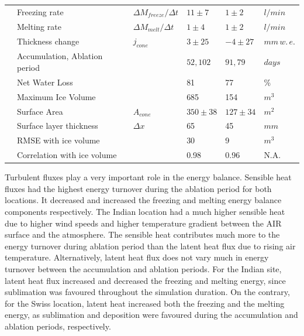 \documentclass[utf8]{frontiersSCNS}
\begin{document}
\begin{table}
\begin{tabular}{@{}|llllll|@{}}
		                       & Freezing rate                   & ${\Delta M_{freeze}}/{\Delta t}$    & $11 \pm 7$    & $1 \pm 2$     & $l/min$ \\
		\multicolumn{1}{|l|}{} & Melting rate                    & ${\Delta M_{melt}}/{\Delta t}$      & $1 \pm 4$     & $1 \pm 2$     & $l/min$ \\
		\multicolumn{1}{|l|}{} & Thickness change                & $j_{cone}$      & $3 \pm 25$    & $-4 \pm 27$   &
		$mm \, w.\,e.$                                                                                                       \\
		\multicolumn{1}{|l|}{} & Accumulation, Ablation period   &                 & $52, 102$     & $91,79$       & $days$  \\
		\multicolumn{1}{|l|}{} & Net Water Loss                  &                 & 81            & 77
		                       & \%                                                                                          \\
		\multicolumn{1}{|l|}{} & Maximum Ice Volume              &                 & 685           & 154           & $m^{3}$ \\
		\multicolumn{1}{|l|}{} & Surface Area                    & $A_{cone}$      & $350 \pm 38$  & $127 \pm 34$  & $m^{2}$ \\\midrule
		\multicolumn{1}{|l|}{\multirow{3}{*}{\rotatebox[origin=c]{90}{Model}}}
		                       & Surface layer thickness & $\Delta x$ & 65          & 45            &                $mm$  \\
		\multicolumn{1}{|l|}{} & RMSE with ice volume        &                 & 30            & 9            & $m^{3}$ \\
		\multicolumn{1}{|l|}{} & Correlation with ice volume &                 & 0.98          & 0.96          &
		N.A.                                                                                                                 \\\bottomrule
	\end{tabular}
\end{table}

Turbulent fluxes play a very important role in the energy balance. Sensible heat fluxes had the highest energy
turnover during the ablation period for both locations. It decreased and increased the freezing and melting
energy balance components respectively. The Indian location had a much higher sensible heat due to higher wind speeds and
higher temperature gradient between the AIR surface and the atmosphere. The sensible heat contributes much more
to the energy turnover during ablation period than the latent heat flux due to rising air temperature. Alternatively, latent
heat flux does not vary much in energy turnover between the accumulation and ablation periods. For the Indian
site, latent heat flux increased and decreased the freezing and melting energy, since sublimation was
favoured throughout the simulation duration. On the contrary, for the Swiss location, latent heat increased both the freezing
and the melting energy, as sublimation and deposition were favoured during the accumulation and ablation
periods, respectively.
\end{document}
